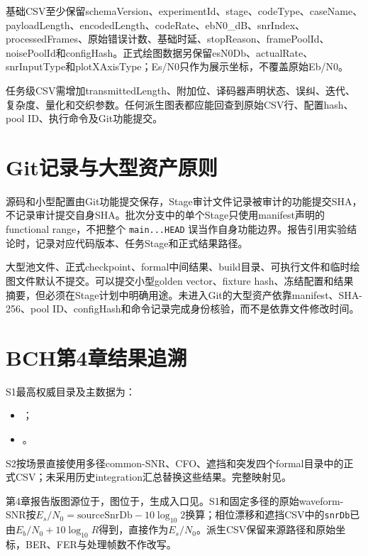 基础CSV至少保留schemaVersion、experimentId、stage、codeType、caseName、payloadLength、encodedLength、codeRate、ebN0\_dB、snrIndex、processedFrames、原始错误计数、基础时延、stopReason、framePoolId、noisePoolId和configHash。正式绘图数据另保留esN0Db、actualRate、snrInputType和plotXAxisType；Es/N0只作为展示坐标，不覆盖原始Eb/N0。

任务级CSV需增加transmittedLength、附加位、译码器声明状态、误纠、迭代、复杂度、量化和交织参数。任何派生图表都应能回查到原始CSV行、配置hash、pool ID、执行命令及Git功能提交。

\section{Git记录与大型资产原则}

源码和小型配置由Git功能提交保存，Stage审计文件记录被审计的功能提交SHA，不记录审计提交自身SHA。批次分支中的单个Stage只使用manifest声明的functional range，不把整个 \texttt{main...HEAD} 误当作自身功能边界。报告引用实验结论时，记录对应代码版本、任务Stage和正式结果路径。

大型池文件、正式checkpoint、formal中间结果、build目录、可执行文件和临时绘图文件默认不提交。可以提交小型golden vector、fixture hash、冻结配置和结果摘要，但必须在Stage计划中明确用途。未进入Git的大型资产依靠manifest、SHA-256、pool ID、configHash和命令记录完成身份核验，而不是依靠文件修改时间。

\section{BCH第4章结果追溯}

\begingroup
\small
\sloppy

S1最高权威目录及主数据为：
\begin{itemize}
  \item {}；
  \item {}。
\end{itemize}
S2按场景直接使用多径common-SNR、CFO、遮挡和突发四个formal目录中的正式CSV；未采用历史integration汇总替换这些结果。完整映射见。

第4章报告版图源位于，图位于，生成入口见。S1和固定多径的原始waveform-SNR按$E_s/N_0=\mathrm{sourceSnrDb}-10\log_{10}2$换算；相位漂移和遮挡CSV中的\texttt{snrDb}已由$E_b/N_0+10\log_{10}R$得到，直接作为$E_s/N_0$。派生CSV保留来源路径和原始坐标，BER、FER与处理帧数不作改写。

